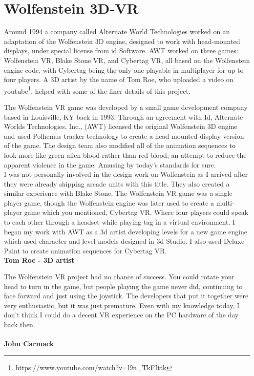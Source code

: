 \section{Wolfenstein 3D-VR}
Around 1994 a company called Alternate World Technologies worked on an adaptation of the Wolfenstein 3D engine, designed to work with head-mounted displays, under special license from id Software. AWT worked on three games: Wolfenstein VR, Blake Stone VR, and Cybertag VR, all based on the Wolfenstein engine code, with Cybertag being the only one playable in multiplayer for up to four players. A 3D artist by the name of Tom Roe, who uploaded a video on youtube\footnote{https://www.youtube.com/watch?v=l9n\_TkFIttk}, helped with some of the finer details of this project.\\

\begin{fancyquotes}
The Wolfenstein VR game was developed by a small game development company based in Louisville, KY back in 1993. Through an agreement with Id, Alternate Worlds Technologies, Inc., (AWT) licensed the original Wolfenstein 3D engine and used Polhemus tracker technology to create a head mounted display version of the game. The design team also modified all of the animation sequences to look more like green alien blood rather than red blood; an attempt to reduce the apparent violence in the game. Amusing by today's standards for sure.
 \bigskip \\
I was not personally involved in the design work on Wolfenstein as I arrived after they were already shipping arcade units with this title. They also created a similar experience with Blake Stone. The Wolfenstein VR game was a single player game, though the Wolfenstein engine was later used to create a multi-player game which you mentioned, Cybertag VR. Where four players could speak to each other through a headset while playing tag in a virtual environment. I began my work with AWT as a 3d artist developing levels for a new game engine which used character and level models designed in 3d Studio. I also used Deluxe Paint to create animation sequences for Cybertag VR.
 \bigskip \\
\textbf{Tom Roe - 3D artist}
 \end{fancyquotes}
\par

\par
\begin{fancyquotes}
The Wolfenstein VR project had no chance of success.  You could rotate your head to turn in the game, but people playing the game never did, continuing to face forward and just using the joystick.  The developers that put it together were very enthusiastic, but it was just premature.  Even with my knowledge today, I don’t think I could do a decent VR experience on the PC hardware of the day back then.\\
\bigskip \\
\textbf{John Carmack}
 \end{fancyquotes}

